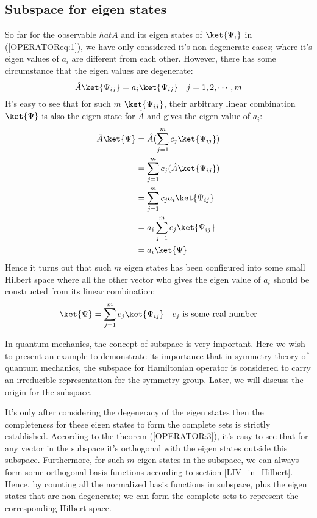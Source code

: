 \subsection{Subspace for eigen states}
\label{subspace_in_operator}
%
%
%
So far for the observable $hat{A}$ and its eigen states of
$\ket{\Psi_{i}}$ in (\ref{OPERATOReq:1}), we have only considered
it's non-degenerate cases; where it's eigen values of $a_{i}$ are
different from each other. However, there has some circumstance that
the eigen values are degenerate:
\begin{equation}\label{OPERATOReq:32}
\hat{A}\ket{\Psi_{ij}} = a_{i}\ket{\Psi_{ij}} \quad j=1, 2, \cdots,
m
\end{equation}
It's easy to see that for such $m$ $\ket{\Psi_{ij}}$, their
arbitrary linear combination $\ket{\Psi}$ is also the eigen state
for $\hat{A}$ and gives the eigen value of $a_{i}$:
\begin{equation}\label{OPERATOReq:33}
\begin{split}
  \hat{A}\ket{\Psi} &= \hat{A}(\sum_{j=1}^{m}c_{j}\ket{\Psi_{ij}}) \\
    &= \sum_{j=1}^{m}c_{j}(\hat{A}\ket{\Psi_{ij}}) \\
    &= \sum_{j=1}^{m}c_{j}a_{i}\ket{\Psi_{ij}} \\
    &= a_{i}\sum_{j=1}^{m}c_{j}\ket{\Psi_{ij}} \\
    &= a_{i}\ket{\Psi}
\end{split}
\end{equation}
Hence it turns out that such $m$ eigen states has been configured
into some small Hilbert space where all the other vector who gives
the eigen value of $a_{i}$ should be constructed from its linear
combination:
\begin{equation}\label{}
\ket{\Psi} = \sum_{j=1}^{m}c_{j}\ket{\Psi_{ij}} \quad \text{$c_{j}$
is some real number}
\end{equation}

In quantum mechanics, the concept of subspace is very important.
Here we wish to present an example to demonstrate its importance
that in symmetry theory of quantum mechanics, the subspace for
Hamiltonian operator is considered to carry an irreducible
representation for the symmetry group. Later, we will discuss the
origin for the subspace.

It's only after considering the degeneracy of the eigen states then
the completeness for these eigen states to form the complete sets is
strictly established. According to the theorem (\ref{OPERATOR:3}),
it's easy to see that for any vector in the subspace it's orthogonal
with the eigen states outside this subspace. Furthermore, for such
$m$ eigen states in the subspace, we can always form some orthogonal
basis functions according to section \ref{LIV_in_Hilbert}. Hence, by
counting all the normalized basis functions in subspace, plus the
eigen states that are non-degenerate; we can form the complete sets
to represent the corresponding Hilbert space.

